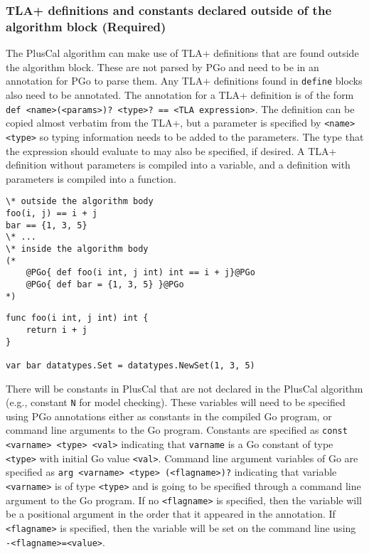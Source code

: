 \subsubsection{TLA+ definitions and constants declared outside of the algorithm block (Required)}
The PlusCal algorithm can make use of TLA+ definitions that are found outside the algorithm block. These are not parsed by PGo and need to be in an annotation for PGo to parse them. Any TLA+ definitions found in \texttt{define} blocks also need to be annotated. The annotation for a TLA+ definition is of the form \texttt{def <name>(<params>)? <type>? == <TLA expression>}. The definition can be copied almost verbatim from the TLA+, but a parameter is specified by \texttt{<name> <type>} so typing information needs to be added to the parameters. The type that the expression should evaluate to may also be specified, if desired. A TLA+ definition without parameters is compiled into a variable, and a definition with parameters is compiled into a function.

\noindent\begin{minipage}{\textwidth}
\begin{lstlisting}[language=pcal]
\* outside the algorithm body
foo(i, j) == i + j
bar == {1, 3, 5}
\* ...
\* inside the algorithm body
(*
	@PGo{ def foo(i int, j int) int == i + j}@PGo
	@PGo{ def bar = {1, 3, 5} }@PGo
*)
\end{lstlisting}
\end{minipage}

\noindent\begin{minipage}{\textwidth}
\begin{lstlisting}[language=golang]
func foo(i int, j int) int {
	return i + j
}

var bar datatypes.Set = datatypes.NewSet(1, 3, 5)
\end{lstlisting}
\end{minipage}

There will be constants in PlusCal that are not declared in the PlusCal algorithm (e.g., constant \texttt{N} for model checking). These variables will need to be specified using PGo annotations either as constants in the compiled Go program, or command line arguments to the Go program. Constants are specified as \texttt{const <varname> <type> <val>} indicating that \texttt{varname} is a Go constant of type \texttt{<type>} with initial Go value \texttt{<val>}. Command line argument variables of Go are specified as \texttt{arg <varname> <type> (<flagname>)?} indicating that variable \texttt{<varname>} is of type \texttt{<type>} and is going to be specified through a command line argument to the Go program. If no \texttt{<flagname>} is specified, then the variable will be a positional argument in the order that it appeared in the annotation. If \texttt{<flagname>} is specified, then the variable will be set on the command line using \texttt{-<flagname>=<value>}.

